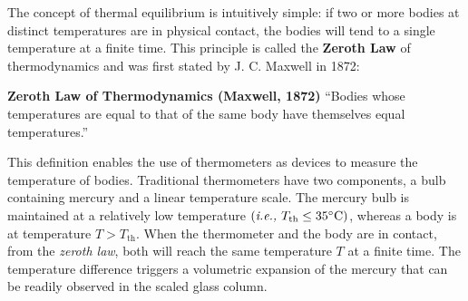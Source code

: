    The concept of thermal equilibrium is intuitively simple: if two or more bodies at distinct temperatures are in physical contact, the bodies will tend to a single temperature at a finite time. This principle is called the {\bf Zeroth Law} of thermodynamics and was first stated by J. C. Maxwell in 1872:
   \begin{MyBlock}{{\bf Zeroth Law of Thermodynamics (Maxwell, 1872) } }
     ``Bodies whose temperatures are equal to that of the same body have themselves equal temperatures.”
   \end{MyBlock}
   This definition enables the use of thermometers as devices to measure the temperature of bodies. Traditional thermometers have two components, a bulb containing mercury and a linear temperature scale. The mercury bulb is maintained at a relatively low temperature $\left(\text{{\it i.e., }} T_{\text{th}}\le 35^{\circ}\text{C}\right)$, whereas a body is at temperature $T>T_{\text{th}}$. When the thermometer and the body are in contact, from the {\it zeroth law}, both will reach the same temperature $T$ at a finite time. The temperature difference triggers a volumetric expansion of the mercury that can be readily observed in the scaled glass column.

